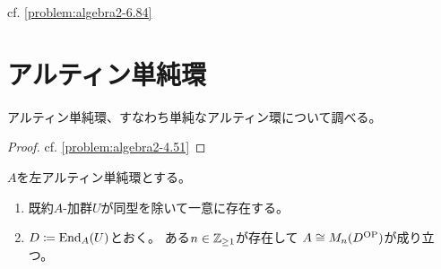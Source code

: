 \documentclass[report]{jlreq}
\begin{document}
\begin{answer}
    cf. \cref{problem:algebra2-6.84}
\end{answer}



%
\section{アルティン単純環}

アルティン単純環、すなわち単純なアルティン環について調べる。


\begin{proof}
    cf. \cref{problem:algebra2-4.51}
\end{proof}

\begin{proposition}
    $A$を左アルティン単純環とする。
    \begin{enumerate}
        \item 既約$A$-加群$U$が同型を除いて一意に存在する。
        \item $D \coloneqq \operatorname{End}_A(U)$とおく。
            ある$n \in \mathbb{Z}_{\ge 1}$が存在して
            $A \cong M_n(D^{\mathrm{OP}})$が成り立つ。
    \end{enumerate}
\end{proposition}
\end{document}
